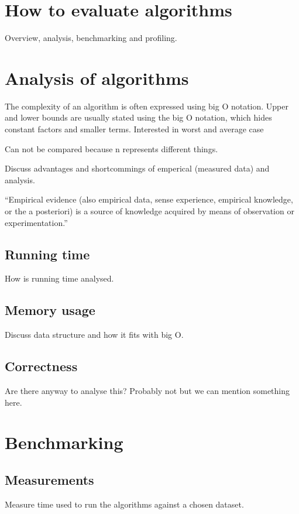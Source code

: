 \documentclass[11pt,twoside,a4paper]{report}
\begin{document}
\section{How to evaluate algorithms}
Overview, analysis, benchmarking and profiling.

\section{Analysis of algorithms}
\label{section:Analysis_of_algorithms}
The complexity of an algorithm is often expressed using big O notation.
Upper and lower bounds are usually stated using the big O notation, which hides constant factors and smaller terms. Interested in worst and average case

Can not be compared because n represents different things.



Discuss advantages and shortcommings of emperical (measured data) and analysis.

“Empirical evidence (also empirical data, sense experience, empirical knowledge, or the a posteriori) is a source of knowledge acquired by means of observation or experimentation.”

\subsection{Running time}
How is running time analysed.

\subsection{Memory usage}
Discuss data structure and how it fits with big O.

\subsection{Correctness}
Are there anyway to analyse this? Probably not but we can mention something here.

\section{Benchmarking}
\label{section:Benchmarking}

\subsection{Measurements}
Measure time used to run the algorithms against a chosen dataset.
\end{document}
